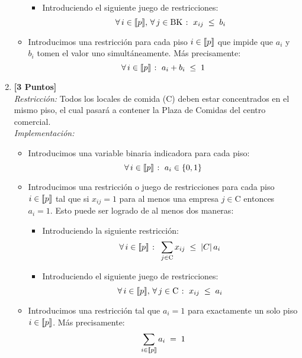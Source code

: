 \documentclass[ a4paper, twoside, 11pt]{article}
\begin{document}
\begin{problem}
\begin{enumerate}[label=\textbf{\alph*)}]
\begin{itemize}
\begin{itemize}
\[\]
\item Introduciendo el siguiente juego de restricciones: 
\[
\forall \, i \in \llbracket p \rrbracket, \, \forall \, j \in \text{BK} \; \colon \;
x_{ij} \; \leq \; b_i
\]
\end{itemize}
\item Introducimos una restricci\'on para cada piso $i \in \llbracket p \rrbracket$ que impide que $a_i$ y $b_i$ tomen el valor uno simult\'aneamente. M\'as precisamente: 
\[
\forall \, i \in \llbracket p \rrbracket \; \colon \; a_i + b_i \; \leq \; 1
\]
\end{itemize}
\item \textbf{[3 Puntos]} \\[1ex]
\emph{Restricci\'on:} Todos los locales de comida (C) deben estar concentrados en el mismo piso, el cual pasar\'a a contener la Plaza de Comidas del centro comercial. \\[1ex]
\emph{Implementaci\'on:}
\begin{itemize}
\item Introducimos una variable binaria indicadora para cada piso: 
\[
\forall \, i \in \llbracket p \rrbracket \; \colon \; a_i \in \{ 0, 1 \}
\]
\item Introducimos una restricci\'on o juego de restricciones para cada piso $i \in \llbracket p \rrbracket$ tal que si $x_{ij} = 1$ para al menos una empresa $j \in \text{C}$ entonces $a_i = 1$. Esto puede ser logrado de al menos dos maneras: 
\begin{itemize}
\item Introduciendo la siguiente restricci\'on: 
\[
\forall \, i \in \llbracket p \rrbracket \; \colon \;
\sum_{j \in \text{C}} x_{ij} \; \leq \; |C| \, a_i
\]
\item Introduciendo el siguiente juego de restricciones: 
\[
\forall \, i \in \llbracket p \rrbracket, \, \forall \, j \in \text{C} \; \colon \;
x_{ij} \; \leq \; a_i
\]
\end{itemize}
\item Introducimos una restricci\'on tal que $a_i = 1$ para exactamente un solo piso $i \in \llbracket p \rrbracket$. M\'as precisamente: 
\[
\sum_{i \in \llbracket p \rrbracket} a_i \; = \; 1
\]
\end{itemize}


\end{enumerate}
\end{problem}
\end{document}
